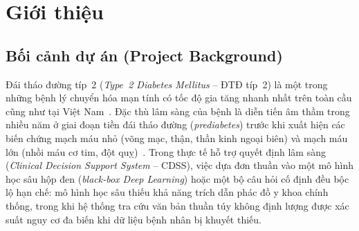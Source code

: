 \chapter{Giới thiệu}
\label{chap:intro}

\section{Bối cảnh dự án (Project Background)}
\label{sec:project-background}

Đái tháo đường típ~2 (\emph{Type~2 Diabetes Mellitus} -- ĐTĐ típ~2) là một trong những bệnh lý chuyển hóa mạn tính có tốc độ gia tăng nhanh nhất trên toàn cầu cũng như tại Việt Nam~\cite{idf2021,byt5481}. Đặc thù lâm sàng của bệnh là diễn tiến âm thầm trong nhiều năm ở giai đoạn tiền đái tháo đường (\emph{prediabetes}) trước khi xuất hiện các biến chứng mạch máu nhỏ (võng mạc, thận, thần kinh ngoại biên) và mạch máu lớn (nhồi máu cơ tim, đột quỵ)~\cite{ada2024}. Trong thực tế hỗ trợ quyết định lâm sàng (\emph{Clinical Decision Support System} -- CDSS), việc dựa đơn thuần vào một mô hình học sâu hộp đen (\emph{black-box Deep Learning}) hoặc một bộ câu hỏi cố định đều bộc lộ hạn chế: mô hình học sâu thiếu khả năng trích dẫn phác đồ y khoa chính thống, trong khi hệ thống tra cứu văn bản thuần túy không định lượng được xác suất nguy cơ đa biến khi dữ liệu bệnh nhân bị khuyết thiếu.

